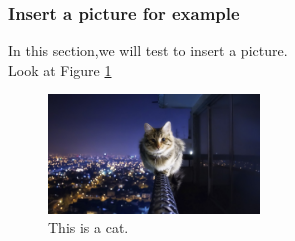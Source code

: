 \documentclass[a4paper,11pt]{article}
\begin{document}
\subsubsection{Insert a picture for example}
In this section,we will test to insert a picture.\\

Look at Figure \ref{fig:1}

\begin{figure}[!h]%
\centering %
\includegraphics[width=0.50\textwidth]{./Pic/cat.JPG}
\caption{This is a cat.}
\label{fig:1}       %
\end{figure}
\end{document}
